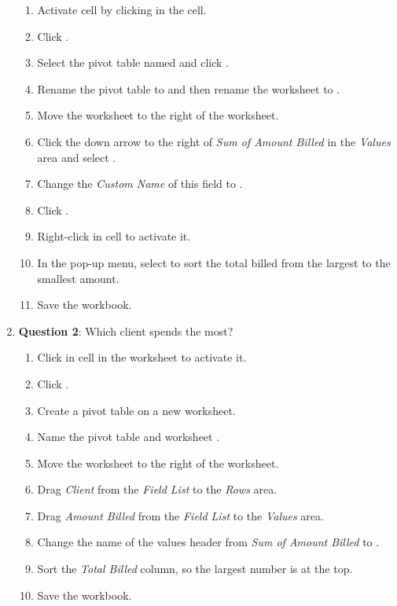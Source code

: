 \begin{enumbox}
\begin{enumerate}
		\begin{enumerate}
			\item Activate cell  by clicking in the cell.
			\item Click .	
			\item Select the pivot table named  and click .
			\item Rename the pivot table to  and then rename the worksheet to .
			\item Move the  worksheet to the right of the  worksheet.
			\item Click the down arrow to the right of \textit{Sum of Amount Billed} in the \textit{Values} area and select .
			\item Change the \textit{Custom Name} of this field to .
			\item Click .
			\item Right-click in cell  to activate it.
			\item In the pop-up menu, select  to sort the total billed from the largest to the smallest amount.
			\item Save the  workbook.
		\end{enumerate}
	
		\item{\textbf{Question 2}: Which client spends the most?	}
	
		\begin{enumerate}
			\item Click in cell  in the  worksheet to activate it.
			\item Click .
			\item Create a pivot table on a new worksheet.
			\item Name the pivot table and worksheet .
			\item Move the  worksheet to the right of the  worksheet.
			\item Drag \textit{Client} from the \textit{Field List} to the \textit{Rows} area.
			\item Drag \textit{Amount Billed} from the \textit{Field List} to the \textit{Values} area.
			\item Change the name of the values header from \textit{Sum of Amount Billed} to .
			\item Sort the \textit{Total Billed} column, so the largest number is at the top.
			\item Save the  workbook.
		\end{enumerate}
	

\end{enumerate}
\end{enumbox}
